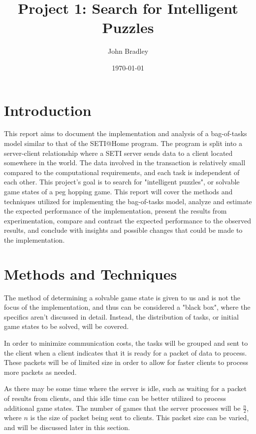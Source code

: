 \documentclass{article}
\title{Project 1: Search for Intelligent Puzzles}
\author{John Bradley}
\date{\today}
\begin{document}
  \maketitle

  \section{Introduction}

  This report aims to document the implementation and analysis of a 
  bag-of-tasks model similar to that of the SETI@Home program. The program
  is split into a server-client relationship where a SETI server sends data to
  a client located somewhere in the world. The data involved in the transaction
  is relatively small compared to the computational requirements, and each task
  is independent of each other. This project's goal is to search for 
  "intelligent puzzles", or solvable game states of a peg hopping game.  This 
  report will cover the methods and techniques utilized for implementing the 
  bag-of-tasks model, analyze and estimate the expected performance of the 
  implementation, present the results from experimentation, compare and contrast 
  the expected performance to the observed results, and conclude with insights 
  and possible changes that could be made to the implementation.

  \section{Methods and Techniques}

  The method of determining a solvable game state is given to us and is not the
  focus of the implementation, and thus can be considered a "black box", where
  the specifics aren't discussed in detail. Instead, the distribution of tasks,
  or initial game states to be solved, will be covered.

  In order to minimize communication costs, the tasks will be grouped and sent
  to the client when a client indicates that it is ready for a packet of data
  to process. These packets will be of limited size in order to allow for faster
  clients to process more packets as needed.

  As there may be some time where the server is idle, such as waiting for a
  packet of results from clients, and this idle time can be better utilized to
  process additional game states. The number of games that the server processes
  will be \(\frac{n}{2}\), where \(n\) is the size of packet being sent to clients.
  This packet size can be varied, and will be discussed later in this section.
\end{document}
